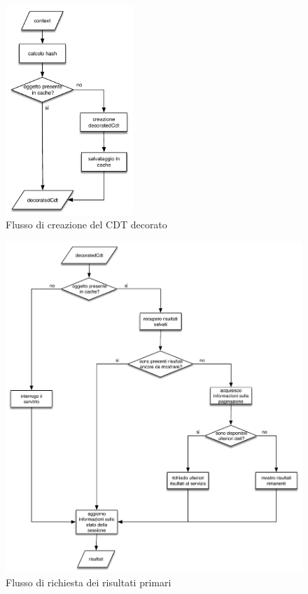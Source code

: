 \begin{figure}[ht]
	\centering
	\includegraphics[width=0.43\textwidth]{4-progettazione-alto-livello/Immagini/diagramma_flusso_decoratedCdt.pdf}
	\caption{Flusso di creazione del CDT decorato\label{fig:flusso-decorated-cdt}}
\end{figure}

\begin{figure}[!t]
	\centering
	\includegraphics[width=\textwidth]{4-progettazione-alto-livello/Immagini/diagramma_flusso_servizi_primari.pdf}
	\caption{Flusso di richiesta dei risultati primari\label{fig:flusso-servizi-primari}}
\end{figure}

